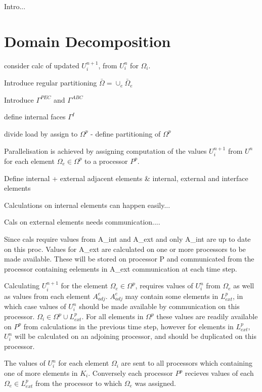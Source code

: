 Intro...

\section{Domain Decomposition}

consider calc of updated $U^{n+1}_i$, from $U^{n}_i$ for $\Omega_i$. 

Introduce regular partitioning $\bar{\Omega} = \cup_{e} \bar{\Omega}_e$

Introduce $\Gamma^{PEC}$ and $\Gamma^{ABC}$

define internal faces $\Gamma^{I}$

divide load by assign to $\Omega^p$ -  define partitioning of $\Omega^p$

Parallelisation is achieved by assigning computation of the values $U^{n+1}_i$ from $U^{n}$ for each element $\Omega_e \in \Omega^p$ to a processor $P^p$.

Define internal + external adjacent elements & internal, external and interface elements


Calculations on internal elements can happen easily...

Cals on external elements needs communication....

Since cals require values from A_int and A_ext and only A_int are up to date on this proc. Values for A_ext are calculated on one or more processors to be made available. These will be stored on processor P and communicated from the processor containing eelements in A_ext communication at each time step.

Calculating $U^{n+1}_i$ for the element $\Omega_e \in \Omega^p$, requires values of $U_i^{n}$ from $\Omega_e$ as well as values from each element $A_{adj}^e$. $A_{adj}^e$ may contain some elements in $L^p_{ext}$, in which case values of $U_i^n$ should be made available by communication on this processor. $\Omega_i \in \Omega^{p} \cup L^p_{ext}$. For all elements in $\Omega^p$ these values are readily available on $P^p$ from calculations in the previous time step, however for elements in $L^p_{ext}$, $U^{n}_i$ will be calculated on an adjoining processor, and should be duplicated on this processor.

The values of $U_i^{n}$ for each element $\Omega_i$ are sent to all processors which containing one of more elements in $K_{i}$.  Conversely each processor $P^p$ recieves values of each $\Omega_e \in L^p_{ext}$ from the processor to which $\Omega_e$ was assigned.

